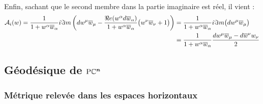 \\
Enfin, sachant que le second membre dans la partie imaginaire est réel, il vient :
\begin{align*}
	\mathcal{A}_i(w) = \frac{1}{1 + w^\alpha\overline{w}_\alpha} i\Im m \left( dw^\mu\overline{w}_\mu -  \frac{\Re e(w^\alpha d\overline{w}_\alpha)}{1 + w^\alpha\overline{w}_\alpha}\big( w^\nu\overline{w}_\nu +1 \big) \right) 
	&= \frac{1}{1 + w^\alpha\overline{w}_\alpha} i\Im m \big( dw^\mu\overline{w}_\mu \big) \\
	&= \frac{1}{1 + w^\alpha\overline{w}_\alpha} \frac{dw^\mu\overline{w}_\mu -  d\overline{w}^\nu w_\nu }{2}
\end{align*}
\skipl


\subsection{Géodésique de $\boldsymbol{\text{\normalfont P}\mathbb{C}^{n}}$}


\subsubsection{Métrique relevée dans les espaces horizontaux}


